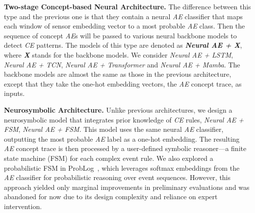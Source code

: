 \textbf{Two-stage Concept-based Neural Architecture.} The difference between this type and the previous one is that they contain a neural \emph{AE} classifier that maps each window of sensor embedding vector to a most probable \emph{AE} class. Then the sequence of concept \emph{AE}s will be passed to various neural backbone models to detect \emph{CE} patterns. The models of this type are denoted as \textbf{\emph{Neural AE + X}}, where \emph{\textbf{X}} stands for the backbone models. We consider \emph{Neural AE + LSTM}, \emph{Neural AE + TCN}, \emph{Neural AE + Transformer} and \emph{Neural AE + Mamba}. The backbone models are almost the same as those in the previous architecture, except that they take the one-hot embedding vectors, the \emph{AE} concept trace, as inputs.

\textbf{Neurosymbolic Architecture.} Unlike previous architectures, we design a neurosymbolic model that integrates prior knowledge of \emph{CE} rules, \emph{Neural AE + FSM}, \emph{Neural AE + FSM}. This model uses the same neural \emph{AE} classifier, outputting the most probable \emph{AE} label as a one-hot embedding. The resulting \emph{AE} concept trace is then processed by a user-defined symbolic reasoner—a finite state machine (FSM) for each complex event rule. We also explored a probabilistic FSM in ProbLog~\cite{problog}, which leverages softmax embeddings from the \emph{AE} classifier for probabilistic reasoning over event sequences. However, this approach yielded only marginal improvements in preliminary evaluations and was abandoned for now due to its design complexity and reliance on expert intervention.




